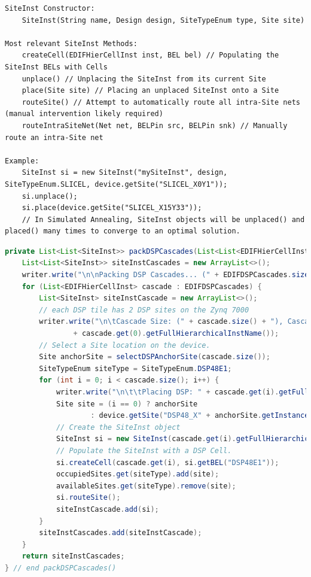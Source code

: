 \begin{lstlisting}[caption=\texttt{SiteInst} constructor and methods.]
SiteInst Constructor: 
    SiteInst(String name, Design design, SiteTypeEnum type, Site site)

Most relevant SiteInst Methods:
    createCell(EDIFHierCellInst inst, BEL bel) // Populating the SiteInst BELs with Cells
    unplace() // Unplacing the SiteInst from its current Site
    place(Site site) // Placing an unplaced SiteInst onto a Site
    routeSite() // Attempt to automatically route all intra-Site nets (manual intervention likely required)
    routeIntraSiteNet(Net net, BELPin src, BELPin snk) // Manually route an intra-Site net

Example:
    SiteInst si = new SiteInst("mySiteInst", design, SiteTypeEnum.SLICEL, device.getSite("SLICEL_X0Y1"));
    si.unplace();
    si.place(device.getSite("SLICEL_X15Y33"));
    // In Simulated Annealing, SiteInst objects will be unplaced() and placed() many times to converge to an optimal solution. 

\end{lstlisting}




\begin{lstlisting}[language=java, caption={Packing DSPCascades into \texttt{DSP48E1} \texttt{SiteInst}s.}, label={lst:carry_chains}]
private List<List<SiteInst>> packDSPCascades(List<List<EDIFHierCellInst>> EDIFDSPCascades) throws IOException {
    List<List<SiteInst>> siteInstCascades = new ArrayList<>();
    writer.write("\n\nPacking DSP Cascades... (" + EDIFDSPCascades.size() + ")");
    for (List<EDIFHierCellInst> cascade : EDIFDSPCascades) {
        List<SiteInst> siteInstCascade = new ArrayList<>();
        // each DSP tile has 2 DSP sites on the Zynq 7000
        writer.write("\n\tCascade Size: (" + cascade.size() + "), Cascade Anchor: "
                + cascade.get(0).getFullHierarchicalInstName());
        // Select a Site location on the device. 
        Site anchorSite = selectDSPAnchorSite(cascade.size());
        SiteTypeEnum siteType = SiteTypeEnum.DSP48E1;
        for (int i = 0; i < cascade.size(); i++) {
            writer.write("\n\t\tPlacing DSP: " + cascade.get(i).getFullHierarchicalInstName());
            Site site = (i == 0) ? anchorSite
                    : device.getSite("DSP48_X" + anchorSite.getInstanceX() + "Y" + (anchorSite.getInstanceY() + i));
            // Create the SiteInst object
            SiteInst si = new SiteInst(cascade.get(i).getFullHierarchicalInstName(), design, siteType, site);
            // Populate the SiteInst with a DSP Cell. 
            si.createCell(cascade.get(i), si.getBEL("DSP48E1"));
            occupiedSites.get(siteType).add(site);
            availableSites.get(siteType).remove(site);
            si.routeSite();
            siteInstCascade.add(si);
        }
        siteInstCascades.add(siteInstCascade);
    }
    return siteInstCascades;
} // end packDSPCascades()
\end{lstlisting}


